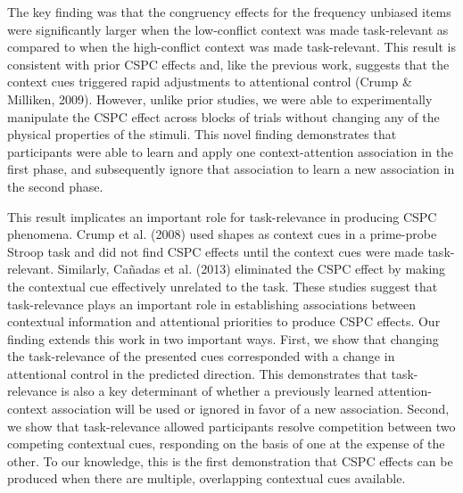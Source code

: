 \documentclass[english,,man,floatsintext]{apa6}
\begin{document}
The key finding was that the congruency effects for the frequency unbiased items were significantly larger when the low-conflict context was made task-relevant as compared to when the high-conflict context was made task-relevant. This result is consistent with prior CSPC effects and, like the previous work, suggests that the context cues triggered rapid adjustments to attentional control (Crump \& Milliken, 2009). However, unlike prior studies, we were able to experimentally manipulate the CSPC effect across blocks of trials without changing any of the physical properties of the stimuli. This novel finding demonstrates that participants were able to learn and apply one context-attention association in the first phase, and subsequently ignore that association to learn a new association in the second phase.

This result implicates an important role for task-relevance in producing CSPC phenomena. Crump et al. (2008) used shapes as context cues in a prime-probe Stroop task and did not find CSPC effects until the context cues were made task-relevant. Similarly, Cañadas et al. (2013) eliminated the CSPC effect by making the contextual cue effectively unrelated to the task. These studies suggest that task-relevance plays an important role in establishing associations between contextual information and attentional priorities to produce CSPC effects. Our finding extends this work in two important ways. First, we show that changing the task-relevance of the presented cues corresponded with a change in attentional control in the predicted direction. This demonstrates that task-relevance is also a key determinant of whether a previously learned attention-context association will be used or ignored in favor of a new association. Second, we show that task-relevance allowed participants resolve competition between two competing contextual cues, responding on the basis of one at the expense of the other. To our knowledge, this is the first demonstration that CSPC effects can be produced when there are multiple, overlapping contextual cues available.
\end{document}

